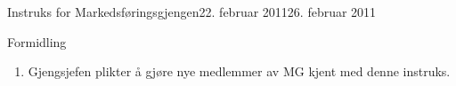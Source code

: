 \begin{instruks}{Instruks for Markedsføringsgjengen}{22. februar 2011}{26. februar 2011 }
    \begin{instruksledd}{Formidling}
        \begin{enumerate}
            \item Gjengsjefen plikter å gjøre nye medlemmer av MG kjent med denne instruks.
        \end{enumerate}
    \end{instruksledd}


\end{instruks}

